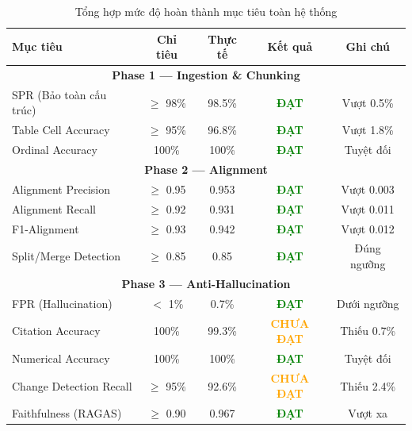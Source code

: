 \begin{table}[H]
    \centering
    \caption{Tổng hợp mức độ hoàn thành mục tiêu toàn hệ thống}
    \label{tab:goal_summary}
    \begin{tabularx}{\textwidth}{X c c c c}
        \toprule
        \textbf{Mục tiêu} & \textbf{Chỉ tiêu} & \textbf{Thực tế} & \textbf{Kết quả} & \textbf{Ghi chú}\\
        \midrule
        \multicolumn{5}{c}{\textbf{Phase 1 — Ingestion \& Chunking}}\\
        \midrule
        SPR (Bảo toàn cấu trúc) & $\geq$ 98\% & 98.5\% & \textcolor{green}{\textbf{ĐẠT}} & Vượt 0.5\%\\
        Table Cell Accuracy & $\geq$ 95\% & 96.8\% & \textcolor{green}{\textbf{ĐẠT}} & Vượt 1.8\%\\
        Ordinal Accuracy & 100\% & 100\% & \textcolor{green}{\textbf{ĐẠT}} & Tuyệt đối\\
        \midrule
        \multicolumn{5}{c}{\textbf{Phase 2 — Alignment}}\\
        \midrule
        Alignment Precision & $\geq$ 0.95 & 0.953 & \textcolor{green}{\textbf{ĐẠT}} & Vượt 0.003\\
        Alignment Recall & $\geq$ 0.92 & 0.931 & \textcolor{green}{\textbf{ĐẠT}} & Vượt 0.011\\
        F1-Alignment & $\geq$ 0.93 & 0.942 & \textcolor{green}{\textbf{ĐẠT}} & Vượt 0.012\\
        Split/Merge Detection & $\geq$ 0.85 & 0.85 & \textcolor{green}{\textbf{ĐẠT}} & Đúng ngưỡng\\
        \midrule
        \multicolumn{5}{c}{\textbf{Phase 3 — Anti-Hallucination}}\\
        \midrule
        FPR (Hallucination) & $<$ 1\% & 0.7\% & \textcolor{green}{\textbf{ĐẠT}} & Dưới ngưỡng\\
        Citation Accuracy & 100\% & 99.3\% & \textcolor{orange}{\textbf{CHƯA ĐẠT}} & Thiếu 0.7\%\\
        Numerical Accuracy & 100\% & 100\% & \textcolor{green}{\textbf{ĐẠT}} & Tuyệt đối\\
        Change Detection Recall & $\geq$ 95\% & 92.6\% & \textcolor{orange}{\textbf{CHƯA ĐẠT}} & Thiếu 2.4\%\\
        Faithfulness (RAGAS) & $\geq$ 0.90 & 0.967 & \textcolor{green}{\textbf{ĐẠT}} & Vượt xa\\
        \bottomrule
    \end{tabularx}
\end{table}

